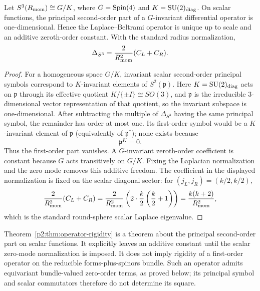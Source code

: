 \documentclass[12pt,a4paper]{article}
\begin{document}
\begin{theorem}
\label{p2:thm:operator-rigidity}
Let $S^3(R_{\mathrm{mom}})\cong G/K$, where $G=\mathrm{Spin}(4)$ and
$K=\mathrm{SU}(2)_{\mathrm{diag}}$.  On scalar functions, the principal
second-order part of a $G$-invariant differential operator is
one-dimensional.  Hence the Laplace--Beltrami operator is unique up to scale
and an additive zeroth-order constant.  With the standard radius
normalization,
\begin{equation}
\Delta_{S^3}=\frac{2}{R_{\mathrm{mom}}^2}(C_L+C_R).
\end{equation}
\end{theorem}

\begin{proof}
For a homogeneous space $G/K$, invariant scalar second-order principal symbols correspond to $K$-invariant elements of $S^2(\mathfrak p)$. Here $K=\mathrm{SU}(2)_{\mathrm{diag}}$ acts on $\mathfrak p$ through its effective quotient $K/\{\pm I\}\cong SO(3)$, and $\mathfrak p$ is the irreducible $3$-dimensional vector representation of that quotient, so the invariant subspace is one-dimensional.  After subtracting the multiple of \(\Delta_{S^3}\) having the same principal symbol, the remainder has order at most one.  Its first-order symbol would be a \(K\)-invariant element of \(\mathfrak p\) (equivalently of \(\mathfrak p^*\)); none exists because
\[
\mathfrak p^K=0.
\]
Thus the first-order part vanishes.  A \(G\)-invariant zeroth-order coefficient is constant because \(G\) acts transitively on \(G/K\).  Fixing the Laplacian normalization and the zero mode removes this additive freedom. The coefficient in the displayed normalization is fixed on the scalar diagonal sector: for $(j_L,j_R)=(k/2,k/2)$,
\[
\frac{2}{R_{\mathrm{mom}}^2}(C_L+C_R)
=\frac{2}{R_{\mathrm{mom}}^2}\left(2\cdot\frac{k}{2}\left(\frac{k}{2}+1\right)\right)
=\frac{k(k+2)}{R_{\mathrm{mom}}^2},
\]
which is the standard round-sphere scalar Laplace eigenvalue.
\end{proof}

\begin{remark}
\label{p2d:rem:scalar-rigidity-first-order-firewall}
Theorem~\ref{p2:thm:operator-rigidity} is a theorem about the principal
second-order part on scalar functions.  It explicitly leaves an additive
constant until the scalar zero-mode normalization is imposed.  It does not
imply rigidity of a first-order operator on the reducible forms-plus-spinors
bundle.  Such an operator admits equivariant bundle-valued zero-order terms,
as proved below; its principal symbol and scalar commutators therefore do not
determine its square.
\end{remark}
\end{document}
